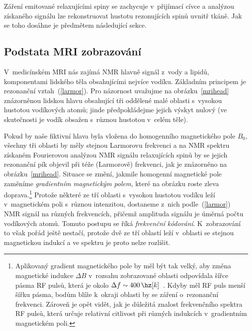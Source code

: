 Záření emitované relaxujícími spiny se zachycuje
v~přijímací cívce a analýzou získaného signálu lze rekonstruovat hustotu
rezonujících spinů uvnitř tkáně.  Jak se toho dosáhne je předmětem následující
sekce.

\subsection{Podstata MRI zobrazování}\label{mrimagbase}%

V~medicínském MRI nás zajímá NMR hlavně signál z~vody a lipidů, komponentami
lidského těla obsahujícími nejvíce vodíku. Základním principem je rezonanční
vztah~(\ref{larmor}).  Pro názornost uvažujme na obrázku~\ref{mrihead}
znázorněnou lidskou hlavu obsahující tři oddělené malé oblasti s~vysokou
hustotou vodíkových atomů; jinde předpokládejme jejich výskyt nulový (ve
skutečnosti je vodík obsažen s~různou hustotou v~celém těle).

Pokud by naše fiktivní hlava byla vložena do homogenního magnetického pole
$B_{0}$, všechny tři oblasti by měly stejnou Larmorovu frekvenci a na NMR
spektru získaném Fourierovou analýzou NMR signálu relaxujících spinů by se
jejich rezonanční pík objevil při téže (Larmorově) frekvenci, jak je
znázorněno na obrázku~\ref{mrihead}. Situace se změní, jakmile homogenní
magnetické pole zaměníme \emph{gradientním magnetickým polem}, které na
obrázku roste zleva doprava.\footnote{Aplikovaný gradient magnetického pole by
  měl být tak velký, aby změna magnetické indukce $\Delta B$ v~rozsahu
  zobrazované oblasti odpovídala šířce pásma RF pulsů, která je okolo $\Delta
  f \sim 400\,\hz[k]$~\cite{Dow-Ken-Joh:2006:PhysDiagImag:}. Kdyby měl RF puls
  menší šířku pásma, bodům blíže k~okraji oblasti by se 
  záření o~rezonanční frekvenci. Zároveň je opět vidět, jak je důležitá
  znalost frekvenčního spektra RF pulsů, která určuje relativní citlivost při
  různých indukcích v~gradientním magnetickém poli.} Protože některé ze tří
oblasti s~vysokou hustotou vodíku leží v~magnetickém poli s~různou intenzitou,
dostaneme z~nich podle~(\ref{larmor}) NMR signál na různých frekvencích,
přičemž amplituda signálu je úměrná počtu vodíkových atomů. Tomuto postupu se
říká \emph{frekvenční kódování}. K~zobrazování to však pořád ještě nestačí,
protože dvě ze tří oblastí leží v~oblasti se stejnou magnetickou indukcí a ve
spektru je proto nelze rozlišit.

